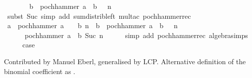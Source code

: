 \begin{isabellebody}
\ \ \isamarkupfalse%
\ \isamarkupfalse%
\ {\isachardoublequoteopen}{\isasymdots}\ {\isacharequal}{\kern0pt}\ b\ {\isacharasterisk}{\kern0pt}\ pochhammer\ {\isacharparenleft}{\kern0pt}a\ {\isacharplus}{\kern0pt}\ {\isacharparenleft}{\kern0pt}b\ {\isacharplus}{\kern0pt}\ {}{\isacharparenright}{\kern0pt}{\isacharparenright}{\kern0pt}\ n{\isachardoublequoteclose}\isanewline
\ \ \ \ \isamarkupfalse%
\ {\isacharparenleft}{\kern0pt}subst\ Suc{\isacharparenright}{\kern0pt}\ {\isacharparenleft}{\kern0pt}simp\ add{\isacharcolon}{\kern0pt}\ sum{\isacharunderscore}{\kern0pt}distrib{\isacharunderscore}{\kern0pt}left\ mult{\isacharunderscore}{\kern0pt}ac\ pochhammer{\isacharunderscore}{\kern0pt}rec{\isacharparenright}{\kern0pt}\isanewline
\ \ \isamarkupfalse%
\ \isamarkupfalse%
\ {\isachardoublequoteopen}a\ {\isacharasterisk}{\kern0pt}\ pochhammer\ {\isacharparenleft}{\kern0pt}{\isacharparenleft}{\kern0pt}a\ {\isacharplus}{\kern0pt}\ {}{\isacharparenright}{\kern0pt}\ {\isacharplus}{\kern0pt}\ b{\isacharparenright}{\kern0pt}\ n\ {\isacharplus}{\kern0pt}\ b\ {\isacharasterisk}{\kern0pt}\ pochhammer\ {\isacharparenleft}{\kern0pt}a\ {\isacharplus}{\kern0pt}\ {\isacharparenleft}{\kern0pt}b\ {\isacharplus}{\kern0pt}\ {}{\isacharparenright}{\kern0pt}{\isacharparenright}{\kern0pt}\ n\ {\isacharequal}{\kern0pt}\isanewline
\ \ \ \ \ \ pochhammer\ {\isacharparenleft}{\kern0pt}a\ {\isacharplus}{\kern0pt}\ b{\isacharparenright}{\kern0pt}\ {\isacharparenleft}{\kern0pt}Suc\ n{\isacharparenright}{\kern0pt}{\isachardoublequoteclose}\isanewline
\ \ \ \ \isamarkupfalse%
\ {\isacharparenleft}{\kern0pt}simp\ add{\isacharcolon}{\kern0pt}\ pochhammer{\isacharunderscore}{\kern0pt}rec\ algebra{\isacharunderscore}{\kern0pt}simps{\isacharparenright}{\kern0pt}\isanewline
\ \ \isamarkupfalse%
\ \isamarkupfalse%
\ {\isacharquery}{\kern0pt}case\ \isacommand{{\isachardot}{\kern0pt}{\isachardot}{\kern0pt}}\isamarkupfalse%
\isanewline
{}\isamarkupfalse%
%
\endisatagproof
{\isafoldproof}%
%
\isadelimproof
%
\endisadelimproof
%
\begin{isamarkuptext}%
Contributed by Manuel Eberl, generalised by LCP.
  Alternative definition of the binomial coefficient as .%

\end{isamarkuptext}
\end{isabellebody}
